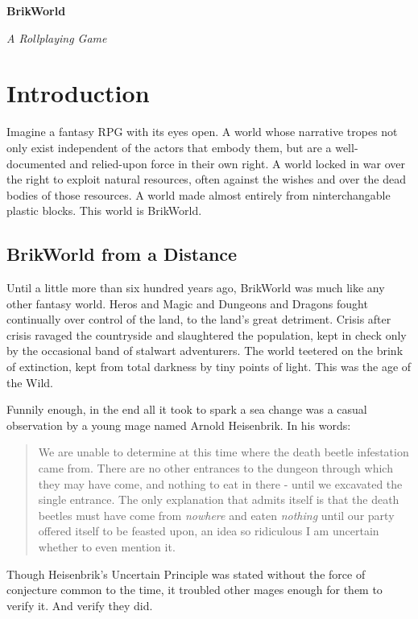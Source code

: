 \documentclass[12pt,a4paper,twocolumn]{article}
\begin{document}

\setlength{\parindent}{0mm}
\setlength{\parskip}{0.5 cm} 

\begin{titlepage}
\Large
{\center \bf BrikWorld}

\normalfont
\begin{flushright}
  {\em A Rollplaying Game}
\end{flushright}
\vspace{1cm}
\end{titlepage}

\normalsize
\section{Introduction}
Imagine a fantasy RPG with its eyes open.  A world whose narrative tropes not only exist independent of the actors that embody them, but are a well-documented and relied-upon force in their own right.  A world locked in war over the right to exploit natural resources, often against the wishes and over the dead bodies of those resources.  A world made almost entirely from ninterchangable plastic blocks.  This world is BrikWorld. 
\subsection{BrikWorld from a Distance}
Until a little more than six hundred years ago, BrikWorld was much like any other fantasy world.  Heros and Magic and Dungeons and Dragons fought continually over control of the land, to the land's great detriment.  Crisis after crisis ravaged the countryside and slaughtered the population, kept in check only by the occasional band of stalwart adventurers.  The world teetered on the brink of extinction, kept from total darkness by tiny points of light.  This was the age of the Wild.

Funnily enough, in the end all it took to spark a sea change was a casual observation by a young mage named Arnold Heisenbrik.  In his words:
\begin{quote}
We are unable to determine at this time where the death beetle infestation came from.  There are no other entrances to the dungeon through which they may have come, and nothing to eat in there - until we excavated the single entrance.  The only explanation that admits itself is that the death beetles must have come from {\em nowhere} and eaten {\em nothing} until our party offered itself to be feasted upon, an idea so ridiculous I am uncertain whether to even mention it.
\end{quote}
Though Heisenbrik's Uncertain Principle was stated without the force of conjecture common to the time, it troubled other mages enough for them to verify it.  And verify they did.
\end{document}
